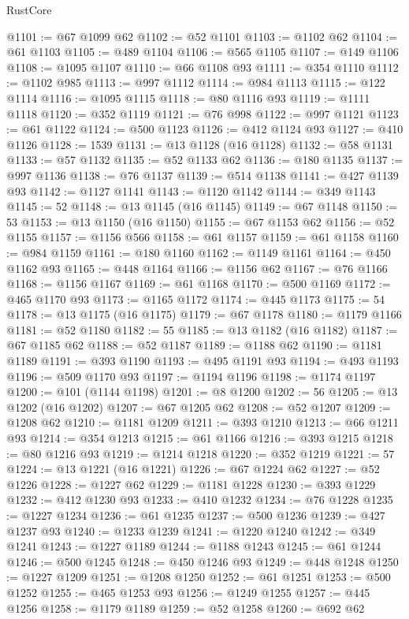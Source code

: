 \begin{lexlean}{RustCore}
\begin{coremodule}
@1101 := @67 @1099 @62
@1102 := @52 @1101
@1103 := @1102 @62
@1104 := @61 @1103
@1105 := @489 @1104
@1106 := @565 @1105
@1107 := @149 @1106
@1108 := @1095 @1107
@1110 := @66 @1108 @93
@1111 := @354 @1110
@1112 := @1102 @985
@1113 := @997 @1112
@1114 := @984 @1113
@1115 := @122 @1114
@1116 := @1095 @1115
@1118 := @80 @1116 @93
@1119 := @1111 @1118
@1120 := @352 @1119
@1121 := @76 @998
@1122 := @997 @1121
@1123 := @61 @1122
@1124 := @500 @1123
@1126 := @412 @1124 @93
@1127 := @410 @1126
@1128 := 1539
@1131 := @13 @1128 (@16 @1128)
@1132 := @58 @1131
@1133 := @57 @1132
@1135 := @52 @1133 @62
@1136 := @180 @1135
@1137 := @997 @1136
@1138 := @76 @1137
@1139 := @514 @1138
@1141 := @427 @1139 @93
@1142 := @1127 @1141
@1143 := @1120 @1142
@1144 := @349 @1143
@1145 := 52
@1148 := @13 @1145 (@16 @1145)
@1149 := @67 @1148
@1150 := 53
@1153 := @13 @1150 (@16 @1150)
@1155 := @67 @1153 @62
@1156 := @52 @1155
@1157 := @1156 @566
@1158 := @61 @1157
@1159 := @61 @1158
@1160 := @984 @1159
@1161 := @180 @1160
@1162 := @1149 @1161
@1164 := @450 @1162 @93
@1165 := @448 @1164
@1166 := @1156 @62
@1167 := @76 @1166
@1168 := @1156 @1167
@1169 := @61 @1168
@1170 := @500 @1169
@1172 := @465 @1170 @93
@1173 := @1165 @1172
@1174 := @445 @1173
@1175 := 54
@1178 := @13 @1175 (@16 @1175)
@1179 := @67 @1178
@1180 := @1179 @1166
@1181 := @52 @1180
@1182 := 55
@1185 := @13 @1182 (@16 @1182)
@1187 := @67 @1185 @62
@1188 := @52 @1187
@1189 := @1188 @62
@1190 := @1181 @1189
@1191 := @393 @1190
@1193 := @495 @1191 @93
@1194 := @493 @1193
@1196 := @509 @1170 @93
@1197 := @1194 @1196
@1198 := @1174 @1197
@1200 := @101 (@1144 @1198)
@1201 := @8 @1200
@1202 := 56
@1205 := @13 @1202 (@16 @1202)
@1207 := @67 @1205 @62
@1208 := @52 @1207
@1209 := @1208 @62
@1210 := @1181 @1209
@1211 := @393 @1210
@1213 := @66 @1211 @93
@1214 := @354 @1213
@1215 := @61 @1166
@1216 := @393 @1215
@1218 := @80 @1216 @93
@1219 := @1214 @1218
@1220 := @352 @1219
@1221 := 57
@1224 := @13 @1221 (@16 @1221)
@1226 := @67 @1224 @62
@1227 := @52 @1226
@1228 := @1227 @62
@1229 := @1181 @1228
@1230 := @393 @1229
@1232 := @412 @1230 @93
@1233 := @410 @1232
@1234 := @76 @1228
@1235 := @1227 @1234
@1236 := @61 @1235
@1237 := @500 @1236
@1239 := @427 @1237 @93
@1240 := @1233 @1239
@1241 := @1220 @1240
@1242 := @349 @1241
@1243 := @1227 @1189
@1244 := @1188 @1243
@1245 := @61 @1244
@1246 := @500 @1245
@1248 := @450 @1246 @93
@1249 := @448 @1248
@1250 := @1227 @1209
@1251 := @1208 @1250
@1252 := @61 @1251
@1253 := @500 @1252
@1255 := @465 @1253 @93
@1256 := @1249 @1255
@1257 := @445 @1256
@1258 := @1179 @1189
@1259 := @52 @1258
@1260 := @692 @62

\end{coremodule}
\end{lexlean}
